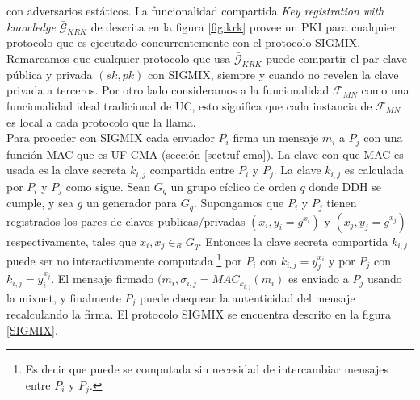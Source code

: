 con adversarios estáticos. La funcionalidad compartida \textit{Key registration with knowledge}
$\bar{\mathcal{G}}_{KRK}$ de \cite{conf/tcc/DodisKSW09} descrita en la figura \ref{fig:krk}
provee un PKI para cualquier protocolo que es ejecutado concurrentemente con el protocolo SIGMIX. Remarcamos
que cualquier protocolo que usa $\bar{\mathcal{G}}_{KRK}$ puede compartir el par clave pública y privada
$(sk,pk)$ con SIGMIX, siempre y cuando no revelen la clave privada a terceros.
Por otro lado consideramos a la funcionalidad $\mathcal{F}_{MN}$ como una funcionalidad ideal tradicional de UC,
esto significa que cada instancia de $\mathcal{F}_{MN}$ es local a cada protocolo que la llama.\\ 
Para proceder con SIGMIX cada enviador $P_i$ firma un mensaje $m_i$ a $P_j$ con una función MAC que es
UF-CMA (sección \ref{sect:uf-cma}). La clave con que MAC es usada es la clave secreta $k_{i,j}$ compartida
entre $P_i$ y $P_j$. La clave $k_{i,j}$ es calculada por $P_i$ y $P_j$ como sigue. Sean $G_q$ un grupo
cíclico de orden $q$ donde DDH se cumple, y sea $g$ un generador para $G_q$. Supongamos que $P_i$ y $P_j$ tienen
registrados los pares de claves publicas/privadas $(x_i, y_i=g^{x_i})$ y $(x_j, y_j=g^{x_j})$ respectivamente,
tales que $x_i, x_j \in_R G_q$. Entonces la clave secreta compartida $k_{i,j}$ puede ser no interactivamente
computada
\footnote{Es decir que puede se computada sin necesidad de intercambiar mensajes entre $P_i$ y $P_j$.}
por $P_i$ con $k_{i,j}=y_j^{x_i}$ y por $P_j$ con $k_{i,j}=y_i^{x_j}$. El mensaje firmado
$(m_i, \sigma_{i,j}=MAC_{k_{i,j}}(m_i)$ es enviado a $P_j$ usando la mixnet, y finalmente $P_j$ puede
chequear la autenticidad del mensaje recalculando la firma. El protocolo SIGMIX se encuentra descrito en
la figura \ref{SIGMIX}.\\
